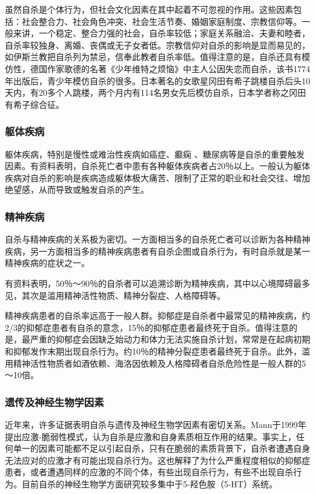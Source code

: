 虽然自杀是个体行为，但社会文化因素在其中起着不可忽视的作用。这些因素包括：社会整合力、社会角色冲突、社会生活节奏、婚姻家庭制度、宗教信仰等。一般来讲，一个稳定、整合力强的社会，自杀率较低；家庭关系融洽、夫妻和睦者，自杀率较独身、离婚、丧偶或无子女者低。宗教信仰对自杀的影响是显而易见的，如伊斯兰教把自杀列为禁忌，信奉此教者自杀率低。值得注意的是，自杀还具有模仿性，德国作家歌德的名著《少年维特之烦恼》中主人公因失恋而自杀，该书1774年出版后，青少年模仿自杀的很多。日本著名的女歌星冈田有希子跳楼自杀后头10天内，有20多个人跳楼，两个月内有114名男女先后模仿自杀，日本学者称之冈田有希子综合征。

\subsubsection{躯体疾病}

躯体疾病，特别是慢性或难治性疾病如癌症、癫痫
、糖尿病等是自杀的重要触发因素。有资料表明，自杀死亡者中患有各种躯体疾病者占20％以上。一般认为躯体疾病对自杀的影响是疾病造成躯体极大痛苦、限制了正常的职业和社会交往、增加绝望感，从而导致或触发自杀的产生。

\subsubsection{精神疾病}

自杀与精神疾病的关系极为密切。一方面相当多的自杀死亡者可以诊断为各种精神疾病，另一方面相当多的精神疾病患者有自杀企图或自杀行为，有时自杀就是某一精神疾病的症状之一。

有资料表明，50％～90％的自杀者可以追溯诊断为精神疾病，其中以心境障碍最多见，其次是滥用精神活性物质、精神分裂症、人格障碍等。

精神疾病患者的自杀率远高于一般人群。抑郁症是自杀者中最常见的精神疾病，约2/3的抑郁症患者有自杀的意念，15％的抑郁症患者最终死于自杀。值得注意的是，最严重的抑郁症会因缺乏始动力和体力无法实施自杀计划，常常是在起病初期和抑郁发作末期出现自杀行为。约10％的精神分裂症患者最终死于自杀。此外，滥用精神活性物质者如酒依赖、海洛因依赖及人格障碍者自杀危险性是一般人群的5～10倍。

\subsubsection{遗传及神经生物学因素}

近年来，许多证据表明自杀与遗传及神经生物学因素有密切关系。Mann于1999年提出应激-脆弱性模式，认为自杀是应激和自身素质相互作用的结果。事实上，任何单一的因素可能都不足以引起自杀，只有在脆弱的素质背景下，自杀者遭遇自身无法应对的应激才有可能出现自杀行为。这也解释了为什么严重程度相似的抑郁症患者，或者遭遇同样的应激的不同个体，有些出现自杀行为，有些不出现自杀行为。目前自杀的神经生物学方面研究较多集中于5-羟色胺（5-HT）系统。

